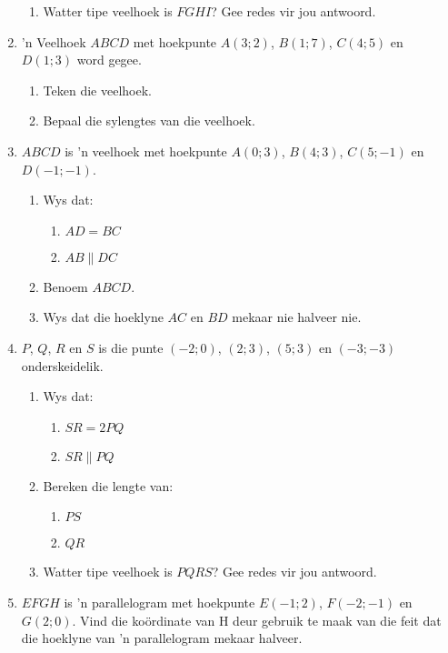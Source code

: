 \begin{eocexercises}{}
\begin{enumerate}[noitemsep, label=\textbf{\arabic*}. ]
\begin{enumerate}[noitemsep, label=\textbf{(\alph*)} ]
\item Watter tipe veelhoek is  $FGHI$? Gee redes vir jou antwoord.
\end{enumerate}
\item  ’n Veelhoek $ABCD$ met hoekpunte $A(3;2)$, $B(1;7)$, $C(4;5)$ en $D(1;3)$ word gegee.
\begin{enumerate}[noitemsep, label=\textbf{(\alph*)} ]
\item  Teken die veelhoek.
\item  Bepaal die sylengtes van die veelhoek.
\end{enumerate}
\item $ABCD$ is ’n veelhoek met hoekpunte $A(0;3)$, $B(4;3)$, $C(5;-1)$ en $D(-1;-1)$.
\begin{enumerate}[noitemsep, label=\textbf{(\alph*)} ]
\item Wys dat:
\begin{enumerate}[noitemsep, label=\textbf{(\roman*)} ]
\item $AD = BC$
\item $AB \parallel DC$
\end{enumerate}
\item Benoem $ABCD$.
\item Wys dat die hoeklyne $AC$ en $BD$ mekaar nie halveer nie.
\end{enumerate}
\item $P$, $Q$, $R$ en $S$ is die punte $(-2;0)$, $(2;3)$, $(5;3)$ en $(-3;-3)$ onderskeidelik.
\begin{enumerate}[noitemsep, label=\textbf{(\alph*)} ]
\item Wys dat:
\begin{enumerate}[noitemsep, label=\textbf{(\roman*)} ]
\item $SR = 2PQ$
\item $SR \parallel PQ$
\end{enumerate}
\item Bereken die lengte van:
\begin{enumerate}[noitemsep, label=\textbf{(\roman*)} ]
\item $PS$
\item $QR$
\end{enumerate}
\item Watter tipe veelhoek is $PQRS$? Gee redes vir jou antwoord.
\end{enumerate}
\item $EFGH$ is ’n parallelogram met hoekpunte $E(-1;2)$, $F(-2;-1)$ en $G(2;0)$. Vind die koördinate van H deur gebruik te maak van die feit dat die hoeklyne van ’n parallelogram mekaar halveer.\newline

\end{enumerate}
\end{eocexercises}
